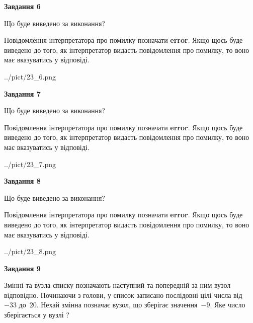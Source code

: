\documentclass[12pt, ukrainian]{article}
\begin{document}
{\begin {large}
{\begin {center}\textbf{Завдання 6}\end {center}}\par
Що буде виведено за виконання?

Повідомлення інтерпретатора про помилку позначати \textbf{error}.
Якщо щось буде виведено до того, як інтерпретатор видасть повідомлення про помилку, 
то воно має вказуватись у відповіді. \par


\begin{center}
	{../pict/23_6.png}
\end{center}
\newpage

{\begin {center}\textbf{Завдання 7}\end {center}}\par
Що буде виведено за виконання?

Повідомлення інтерпретатора про помилку позначати \textbf{error}.
Якщо щось буде виведено до того, як інтерпретатор видасть повідомлення про помилку, 
то воно має вказуватись у відповіді. \par


\begin{center}
	{../pict/23_7.png}
\end{center}
\newpage

{\begin {center}\textbf{Завдання 8}\end {center}}\par
Що буде виведено за виконання?

Повідомлення інтерпретатора про помилку позначати \textbf{error}.
Якщо щось буде виведено до того, як інтерпретатор видасть повідомлення про помилку, 
то воно має вказуватись у відповіді. \par


\begin{center}
	{../pict/23_8.png}
\end{center}
\newpage

{\begin {center}\textbf{Завдання 9}\end {center}}\par
Змінні  та  вузла списку позначають наступний та попередній за ним вузол відповідно. Починаючи з голови, у список записано послідовні цілі числа від~$-33$ до~$20$. Нехай змінна  позначає вузол, що зберігає значення~$-9$.
Яке число зберігається у вузлі  ?\par
\newpage


\end{large}}
\end{document}
